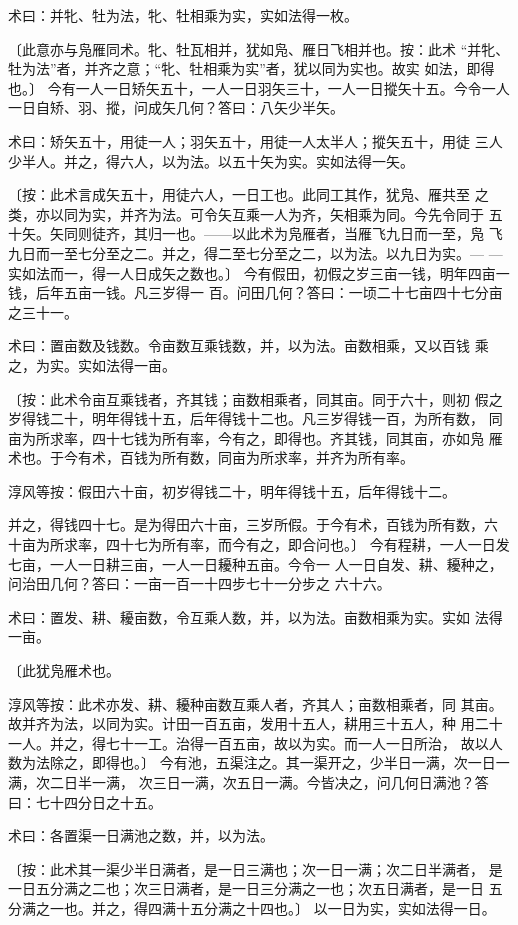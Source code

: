 \documentclass[a4paper,12pt,UTF8,twoside]{ctexbook}
\begin{document}
术曰：并牝、牡为法，牝、牡相乘为实，实如法得一枚。

〔此意亦与凫雁同术。牝、牡瓦相并，犹如凫、雁日飞相并也。按：此术 “并牝、牡为法”者，并齐之意；“牝、牡相乘为实”者，犹以同为实也。故实 如法，即得也。〕 今有一人一日矫矢五十，一人一日羽矢三十，一人一日摐矢十五。今令一人 一日自矫、羽、摐，问成矢几何？答曰：八矢少半矢。

术曰：矫矢五十，用徒一人；羽矢五十，用徒一人太半人；摐矢五十，用徒 三人少半人。并之，得六人，以为法。以五十矢为实。实如法得一矢。

〔按：此术言成矢五十，用徒六人，一日工也。此同工其作，犹凫、雁共至 之类，亦以同为实，并齐为法。可令矢互乘一人为齐，矢相乘为同。今先令同于 五十矢。矢同则徒齐，其归一也。——以此术为凫雁者，当雁飞九日而一至，凫 飞九日而一至七分至之二。并之，得二至七分至之二，以为法。以九日为实。— —实如法而一，得一人日成矢之数也。〕 今有假田，初假之岁三亩一钱，明年四亩一钱，后年五亩一钱。凡三岁得一 百。问田几何？答曰：一顷二十七亩四十七分亩之三十一。

术曰：置亩数及钱数。令亩数互乘钱数，并，以为法。亩数相乘，又以百钱 乘之，为实。实如法得一亩。

〔按：此术令亩互乘钱者，齐其钱；亩数相乘者，同其亩。同于六十，则初 假之岁得钱二十，明年得钱十五，后年得钱十二也。凡三岁得钱一百，为所有数， 同亩为所求率，四十七钱为所有率，今有之，即得也。齐其钱，同其亩，亦如凫 雁术也。于今有术，百钱为所有数，同亩为所求率，并齐为所有率。

淳风等按：假田六十亩，初岁得钱二十，明年得钱十五，后年得钱十二。

并之，得钱四十七。是为得田六十亩，三岁所假。于今有术，百钱为所有数，六 十亩为所求率，四十七为所有率，而今有之，即合问也。〕 今有程耕，一人一日发七亩，一人一日耕三亩，一人一日耰种五亩。今令一 人一日自发、耕、耰种之，问治田几何？答曰：一亩一百一十四步七十一分步之 六十六。

术曰：置发、耕、耰亩数，令互乘人数，并，以为法。亩数相乘为实。实如 法得一亩。

〔此犹凫雁术也。

淳风等按：此术亦发、耕、耰种亩数互乘人者，齐其人；亩数相乘者，同 其亩。故并齐为法，以同为实。计田一百五亩，发用十五人，耕用三十五人，种 用二十一人。并之，得七十一工。治得一百五亩，故以为实。而一人一日所治， 故以人数为法除之，即得也。〕 今有池，五渠注之。其一渠开之，少半日一满，次一日一满，次二日半一满， 次三日一满，次五日一满。今皆决之，问几何日满池？答曰：七十四分日之十五。

术曰：各置渠一日满池之数，并，以为法。

〔按：此术其一渠少半日满者，是一日三满也；次一日一满；次二日半满者， 是一日五分满之二也；次三日满者，是一日三分满之一也；次五日满者，是一日 五分满之一也。并之，得四满十五分满之十四也。〕 以一日为实，实如法得一日。
\end{document}
